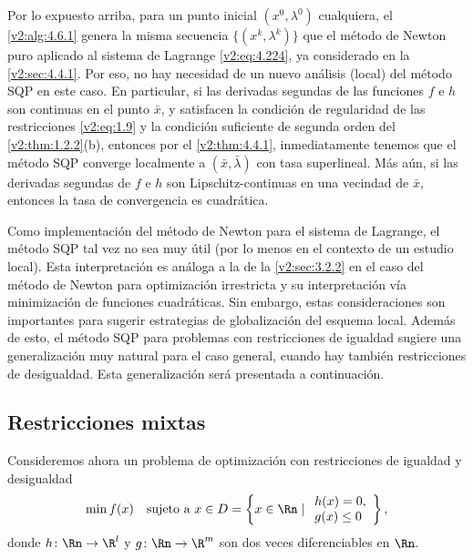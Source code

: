 Por lo expuesto arriba, para un punto inicial $(x^0, \lambda^0)$ cualquiera, el \cref{v2:alg:4.6.1} genera la misma secuencia $\{(x^k, \lambda^k)\}$ que el método de Newton puro aplicado al sistema de Lagrange \eqref{v2:eq:4.224}, ya considerado en la \cref{v2:sec:4.4.1}. Por eso, no hay necesidad de un nuevo análisis (local) del método SQP en este caso. En particular, si las derivadas segundas de las funciones $f$ e $h$ son continuas en el punto $\bar{x}$, y satisfacen la condición de regularidad de las restricciones \eqref{v2:eq:1.9} y la condición suficiente de segunda orden del \cref{v2:thm:1.2.2}(b), entonces por el \cref{v2:thm:4.4.1}, inmediatamente tenemos que el método SQP converge localmente a $(\bar{x}, \bar{\lambda})$ con tasa superlineal. Más aún, si las derivadas segundas de $f$ e $h$ son Lipschitz-continuas en una vecindad de $\bar{x}$, entonces la tasa de convergencia es cuadrática.

Como implementación del método de Newton para el sistema de Lagrange, el método SQP tal vez no sea muy útil (por lo menos en el contexto de un estudio local). Esta interpretación es análoga a la de la \cref{v2:sec:3.2.2} en el caso del método de Newton para optimización irrestricta y su interpretación vía minimización de funciones cuadráticas. Sin embargo, estas consideraciones son importantes para sugerir estrategias de globalización del esquema local. Además de esto, el método SQP para problemas con restricciones de igualdad sugiere una generalización muy natural para el caso general, cuando hay también restricciones de desigualdad. Esta generalización será presentada a continuación.

\subsection{Restricciones mixtas}
\label{v2:sec:4.6.2}

Consideremos ahora un problema de optimización con restricciones de igualdad y desigualdad
\begin{equation}
\min f(x) \quad \text{sujeto a } x \in D = \left\{ x \in \Rn \mid \begin{array}{l} h(x) = 0, \\ g(x) \le 0 \end{array} \right\},
\label{v2:eq:4.227}
\end{equation}
donde $h \colon \Rn \to \R^l$ y $g \colon \Rn \to \R^m$ son dos veces diferenciables en $\Rn$.

